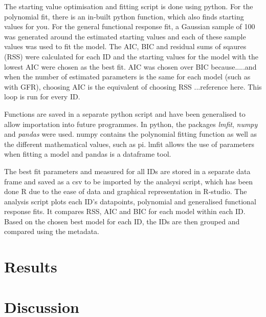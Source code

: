 \documentclass[11pt, a4paper, titlepage]{article}
\begin{document}
The starting value optimisation and fitting script is done using python. For the polynomial fit, there is an in-built python function, which also finds starting values for you. For the general functional response fit, a Gaussian sample of 100 was generated around the estimated starting values and each of these sample values was used to fit the model. The AIC, BIC and residual sums of sqaures (RSS) were calculated for each ID and the starting values for the model with the lowest AIC were chosen as the best fit. AIC was chosen over BIC because.....and when the number of estimated parameters is the same for each model (such as with GFR), choosing AIC is the equivalent of choosing RSS ...reference here. This loop is run for every ID.

Functions are saved in a separate python script and have been generalised to allow importation into future programmes. In python, the packages \textit{lmfit}, \textit{numpy} and \textit{pandas} were used. numpy contains the polynomial fitting function as well as the different mathematical values, such as pi. lmfit allows the use of parameters when fitting a model and pandas is a dataframe tool.

The best fit parameters and measured for all IDs are stored in a separate data frame and saved as a csv to be imported by the analsysi script, which has been done R due to the ease of data and graphical representation in R-studio. The analysis script plots each ID's datapoints, polynomial and generalised functional response fits. It compares RSS, AIC and BIC for each model within each ID. Based on the chosen best model for each ID, the IDs are then grouped and compared using the metadata.

\section{Results}

\section{Discussion}
\end{document}
